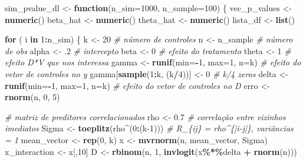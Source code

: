 \documentclass[
]{article}
\newenvironment{Shaded}{\begin{snugshade}}{\end{snugshade}}
\newcommand{\AttributeTok}[1]{\textcolor[rgb]{0.13,0.29,0.53}{#1}}
\newcommand{\CommentTok}[1]{\textcolor[rgb]{0.56,0.35,0.01}{\textit{#1}}}
\newcommand{\ControlFlowTok}[1]{\textcolor[rgb]{0.13,0.29,0.53}{\textbf{#1}}}
\newcommand{\DecValTok}[1]{\textcolor[rgb]{0.00,0.00,0.81}{#1}}
\newcommand{\FloatTok}[1]{\textcolor[rgb]{0.00,0.00,0.81}{#1}}
\newcommand{\FunctionTok}[1]{\textcolor[rgb]{0.13,0.29,0.53}{\textbf{#1}}}
\newcommand{\NormalTok}[1]{#1}
\newcommand{\OtherTok}[1]{\textcolor[rgb]{0.56,0.35,0.01}{#1}}
\newcommand{\SpecialCharTok}[1]{\textcolor[rgb]{0.81,0.36,0.00}{\textbf{#1}}}
\begin{document}
\begin{Shaded}
\begin{Highlighting}[]
\NormalTok{sim\_pvalue\_dl }\OtherTok{\textless{}{-}} \ControlFlowTok{function}\NormalTok{(}\AttributeTok{n\_sim=}\DecValTok{1000}\NormalTok{, }\AttributeTok{n\_sample=}\DecValTok{100}\NormalTok{) \{}
\NormalTok{  vec\_p\_values }\OtherTok{\textless{}{-}} \FunctionTok{numeric}\NormalTok{()}
\NormalTok{  beta\_hat }\OtherTok{\textless{}{-}} \FunctionTok{numeric}\NormalTok{()}
\NormalTok{  theta\_hat }\OtherTok{\textless{}{-}} \FunctionTok{numeric}\NormalTok{()}
\NormalTok{  lista\_df }\OtherTok{\textless{}{-}} \FunctionTok{list}\NormalTok{()}
  
  \ControlFlowTok{for}\NormalTok{ ( i }\ControlFlowTok{in} \DecValTok{1}\SpecialCharTok{:}\NormalTok{n\_sim) \{}
\NormalTok{k }\OtherTok{\textless{}{-}} \DecValTok{20} \CommentTok{\# número de controles}
\NormalTok{n }\OtherTok{\textless{}{-}}\NormalTok{ n\_sample }\CommentTok{\# número de obs}
\NormalTok{alpha }\OtherTok{\textless{}{-}}\NormalTok{ .}\DecValTok{2} \CommentTok{\# intercepto}
\NormalTok{beta }\OtherTok{\textless{}{-}} \DecValTok{0} \CommentTok{\# efeito do tratamento}
\NormalTok{theta }\OtherTok{\textless{}{-}} \DecValTok{1} \CommentTok{\# efeito D*V que nos interessa}
\NormalTok{gamma }\OtherTok{\textless{}{-}} \FunctionTok{runif}\NormalTok{(}\AttributeTok{min=}\SpecialCharTok{{-}}\DecValTok{1}\NormalTok{, }\AttributeTok{max=}\DecValTok{1}\NormalTok{, }\AttributeTok{n=}\NormalTok{k) }\CommentTok{\# efeito do vetor de controles no y}
\NormalTok{gamma[}\FunctionTok{sample}\NormalTok{(}\DecValTok{1}\SpecialCharTok{:}\NormalTok{k, (k}\SpecialCharTok{/}\DecValTok{4}\NormalTok{))] }\OtherTok{\textless{}{-}} \DecValTok{0} \CommentTok{\# k/4 zeros}
\NormalTok{delta }\OtherTok{\textless{}{-}} \FunctionTok{runif}\NormalTok{(}\AttributeTok{min=}\SpecialCharTok{{-}}\DecValTok{1}\NormalTok{, }\AttributeTok{max=}\DecValTok{1}\NormalTok{, }\AttributeTok{n=}\NormalTok{k) }\CommentTok{\# efeito do vetor de controles no D}
\NormalTok{erro }\OtherTok{\textless{}{-}} \FunctionTok{rnorm}\NormalTok{(n, }\DecValTok{0}\NormalTok{, }\DecValTok{5}\NormalTok{)}

\CommentTok{\# matriz de preditores correlacionados}
\NormalTok{rho   }\OtherTok{\textless{}{-}} \FloatTok{0.7}                         \CommentTok{\# correlação entre vizinhos imediatos}
\NormalTok{Sigma     }\OtherTok{\textless{}{-}} \FunctionTok{toeplitz}\NormalTok{(rho}\SpecialCharTok{\^{}}\NormalTok{(}\DecValTok{0}\SpecialCharTok{:}\NormalTok{(k}\DecValTok{{-}1}\NormalTok{)))     }\CommentTok{\# R\_\{ij\} = rho\^{}\{|i{-}j|\}, variâncias = 1}
\NormalTok{mean\_vector }\OtherTok{\textless{}{-}} \FunctionTok{rep}\NormalTok{(}\DecValTok{0}\NormalTok{, k)}
\NormalTok{x }\OtherTok{\textless{}{-}} \FunctionTok{mvrnorm}\NormalTok{(n, mean\_vector, Sigma)}
\NormalTok{x\_interaction }\OtherTok{\textless{}{-}}\NormalTok{ x[,}\DecValTok{10}\NormalTok{]}
\NormalTok{D }\OtherTok{\textless{}{-}} \FunctionTok{rbinom}\NormalTok{(n, }\DecValTok{1}\NormalTok{, }\FunctionTok{invlogit}\NormalTok{(x}\SpecialCharTok{\%*\%}\NormalTok{delta }\SpecialCharTok{+} \FunctionTok{rnorm}\NormalTok{(n)))}


\end{Highlighting}
\end{Shaded}
\end{document}
